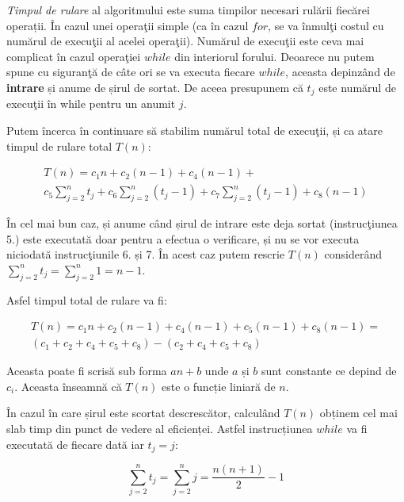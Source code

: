\textit{Timpul de rulare} al algoritmului este suma timpilor necesari rulării fiecărei operații. În cazul unei operaţii simple (ca în cazul $for$, se va înmulţi costul cu numărul de execuţii al acelei operaţii). Numărul de execuţii este ceva mai complicat în cazul operaţiei $while$ din interiorul forului. Deoarece nu putem spune cu siguranţă de câte ori se va executa fiecare $while$, aceasta depinzând de \textbf{intrare} și anume de șirul de sortat. De aceea presupunem că $t_j$ este numărul de execuţii în while pentru un anumit $j$.

Putem încerca în continuare să stabilim numărul total de execuţii, și ca atare timpul de rulare total $T(n)$:

\begin{equation}
\begin{multlined}
T(n) = c_{1}n+c_{2}(n-1)+c_{4}(n-1) + \\ c_{5}\sum_{j=2}^{n}t_{j}+c_{6}\sum_{j=2}^{n}(t_{j}-1)+c_{7}\sum_{j=2}^{n}(t_{j}-1)+c_{8}(n-1)
\end{multlined}
\end{equation}

În cel mai bun caz, și anume când șirul de intrare este deja sortat (instrucţiunea 5.) este executată doar pentru a efectua o verificare, și nu se vor executa niciodată instrucţiunile 6. și 7. În acest caz putem rescrie $T(n)$ considerând $\sum_{j=2}^{n}t_{j} = \sum_{j=2}^{n}1 = n-1$.

Asfel timpul total de rulare va fi:

\begin{equation}
\begin{multlined}
T(n) = c_{1}n+c_{2}(n-1)+c_{4}(n-1) + c_{5}(n-1)+c_{8}(n-1) = \\( c_{1}+ c_{2}+ c_{4}+ c_{5}+ c_{8}) - ( c_{2}+ c_{4}+ c_{5}+ c_{8})
\end{multlined}
\end{equation}

Aceasta poate fi scrisă sub forma $an+b$ unde $a$ și $b$ sunt constante ce depind de $c_i$. Aceasta înseamnă că $T(n)$ este o funcție liniară de $n$.

În cazul în care șirul este scortat descrescător, calculând $T(n)$ obținem cel mai slab timp din punct de vedere al eficienței. Astfel instrucțiunea $while$ va fi executată de fiecare dată iar $t_{j}=j$:

\begin{equation}
\sum_{j=2}^{n}t_{j} = \sum_{j=2}^{n}j = \frac{n(n+1)}{2}-1
\end{equation}

